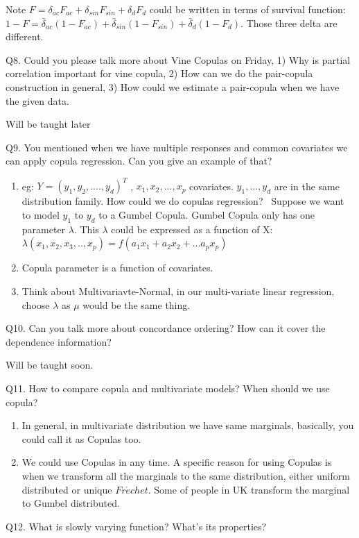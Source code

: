 \documentclass[a4paper,12pt]{texMemo}
\begin{document}
Note $F = \delta_{ac}F_{ac} + \delta_{sin}F_{sin} + \delta_{d}F_d$ could be written in terms of survival function:
$1 - F = \bar{\delta}_{ac}(1 - F_{ac}) + \bar{\delta}_{sin}(1 - F_{sin}) + \bar{\delta}_{d}(1 - F_d)$. Those three delta are different.

Q8. Could you please talk more about Vine Copulas on Friday, 1) Why is partial correlation important for vine copula, 2) How can we do the pair-copula construction in general, 3) How could we estimate a pair-copula when we have the given data.

Will be taught later


Q9. You mentioned when we have multiple responses and common covariates we can apply copula regression. Can you give an example of that?

\begin{enumerate}
\item eg:
$Y=(y_1,y_2,....,y_d)^T$ , $x_1, x_2, ..., x_p$ covariates. $y_1, ..., y_d$ are in the same distribution family.
How could we do copulas regression? \
Suppose we want to model $y_1$ to $y_d$ to a Gumbel Copula. Gumbel Copula only has one parameter $\lambda$. This $\lambda$ could be expressed as a function of X: \
$\lambda(x_1,x_2,x_3,..,x_p)=f(a_1x_1+a_2x_2+...a_px_p)$
\item Copula parameter is a function of covariates.
\item Think about Multivariavte-Normal, in our multi-variate linear regression, choose $\lambda$ as $\mu$ would be the same thing.
\end{enumerate}

Q10. Can you talk more about concordance ordering? How can it cover the dependence information?

Will be taught soon.

Q11. How to compare copula and multivariate models? When should we use copula?

\begin{enumerate}
\item In general, in multivariate distribution we have same marginals, basically, you could call it as Copulas too.
\item We could use Copulas in any time. A specific reason for using Copulas is when we transform all the marginals to the same distribution, either uniform distributed or unique $Fr\acute{e}chet$. Some of people in UK transform the marginal to Gumbel distributed.  
\end{enumerate}

Q12. What is slowly varying function? What's its properties?
\end{document}
